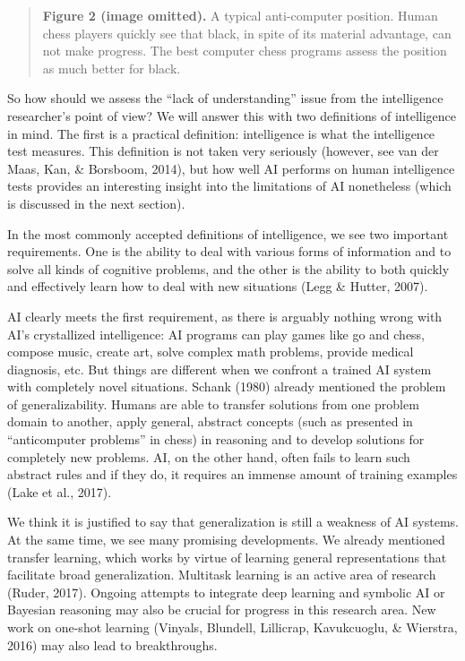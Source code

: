\begin{quote}
\small
\textbf{Figure 2 (image omitted).}
A typical anti-computer position.
Human chess players quickly see that black, in spite of its material
advantage, can not make progress.
The best computer chess programs assess the position as much
better for black.
\end{quote}

So how should we assess the ``lack of understanding'' issue from
the intelligence researcher's point of view?
We will answer this with two definitions of intelligence in mind.
The first is a practical definition: intelligence is what the
intelligence test measures.
This definition is not taken very seriously
(however, see van der Maas, Kan, \& Borsboom, 2014), but how well AI
performs on human intelligence tests provides an interesting insight
into the limitations of AI nonetheless
(which is discussed in the next section).

In the most commonly accepted definitions of intelligence, we see
two important requirements.
One is the ability to deal with various forms of information and
to solve all kinds of cognitive problems, and the other is the ability
to both quickly and effectively learn how to deal with new situations
(Legg \& Hutter, 2007).

AI clearly meets the first requirement, as there is arguably nothing
wrong with AI's crystallized intelligence: AI programs can play games
like go and chess, compose music, create art, solve complex math
problems, provide medical diagnosis, etc.
But things are different when we confront a trained AI system with
completely novel situations.
Schank (1980) already mentioned the problem of generalizability.
Humans are able to transfer solutions from one problem domain
to another, apply general, abstract concepts (such as presented
in ``anticomputer problems'' in chess) in reasoning and to develop
solutions for completely new problems.
AI, on the other hand, often fails to learn such abstract rules and
if they do, it requires an immense amount of training examples
(Lake et al., 2017).

We think it is justified to say that generalization is still a
weakness of AI systems.
At the same time, we see many promising developments.
We already mentioned transfer learning, which works by virtue of
learning general representations that facilitate broad generalization.
Multitask learning is an active area of research (Ruder, 2017).
Ongoing attempts to integrate deep learning and symbolic AI or
Bayesian reasoning may also be crucial for progress in this
research area.
New work on one-shot learning
(Vinyals, Blundell, Lillicrap, Kavukcuoglu, \& Wierstra, 2016)
may also lead to breakthroughs.

